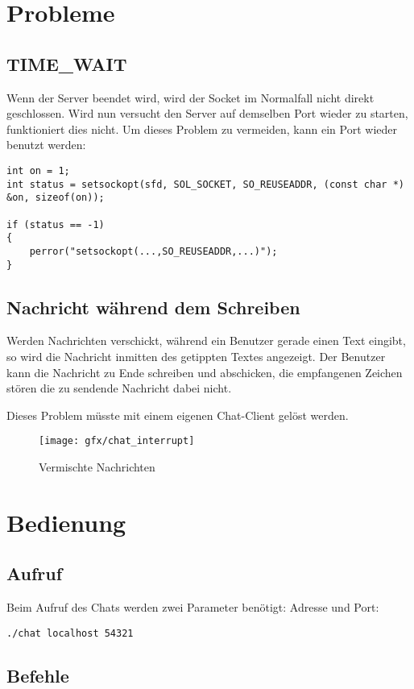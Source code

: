 \documentclass[a4paper]{article}
\begin{document}
\section{Probleme}
\subsection{TIME\_WAIT}
Wenn der Server beendet wird, wird der Socket im Normalfall nicht direkt geschlossen. Wird nun versucht den Server auf demselben Port wieder zu starten, funktioniert dies nicht. Um dieses Problem zu vermeiden, kann ein Port wieder benutzt werden:

\begin{verbatim}
int on = 1;
int status = setsockopt(sfd, SOL_SOCKET, SO_REUSEADDR, (const char *) &on, sizeof(on));

if (status == -1) 
{   
    perror("setsockopt(...,SO_REUSEADDR,...)");
}
\end{verbatim}

\subsection{Nachricht während dem Schreiben}
Werden Nachrichten verschickt, während ein Benutzer gerade einen Text eingibt, so wird die Nachricht inmitten des getippten Textes angezeigt. Der Benutzer kann die Nachricht zu Ende schreiben und abschicken, die empfangenen Zeichen stören die zu sendende Nachricht dabei nicht.

Dieses Problem müsste mit einem eigenen Chat-Client gelöst werden.

\begin{figure}[H]
    \centering
    \texttt{[image: gfx/chat\_interrupt]}
    \caption{Vermischte Nachrichten}
    \label{img:chat_interrupt}
\end{figure}

\section{Bedienung}
\subsection{Aufruf}
Beim Aufruf des Chats werden zwei Parameter benötigt: Adresse und Port:

\texttt{./chat localhost 54321}

\subsection{Befehle}
\end{document}
